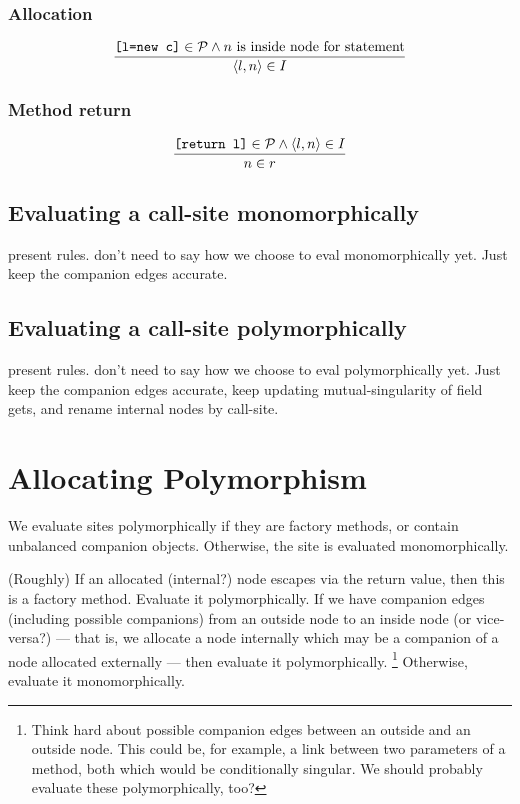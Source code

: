 \documentclass[11pt,notitlepage]{article}
\begin{document}
\subsubsection{Allocation}

\begin{displaymath}
\dfrac
{\text{\tt [l=new c]}\in\mathcal{P} \wedge
 n \text{ is inside node for statement} }
{\left\langle l,n \right\rangle\in I}
\end{displaymath}

\subsubsection{Method return}

\begin{displaymath}
\dfrac
{\text{\tt [return l]}\in\mathcal{P} \wedge
 \left\langle l,n \right\rangle\in I}
{n\in r}
\end{displaymath}


\subsection{Evaluating a call-site monomorphically}

present rules.  don't need to say how we choose to eval
monomorphically yet.  Just keep the companion edges accurate.

\subsection{Evaluating a call-site polymorphically}

present rules.  don't need to say how we choose to eval
polymorphically yet.  Just keep the companion edges accurate,
keep updating mutual-singularity of field gets,
and rename internal nodes by call-site.

\section{Allocating Polymorphism}

We evaluate sites polymorphically if they are factory methods, or
contain unbalanced companion objects.  Otherwise, the site is
evaluated monomorphically.

(Roughly) If an allocated (internal?) node escapes via the return
value, then this is a factory method.  Evaluate it polymorphically.
If we have companion edges (including possible companions) from
an outside node to an inside node (or vice-versa?) --- that is, we
allocate a node internally which may be a companion of a node allocated
externally --- then evaluate it polymorphically.%
\footnote{Think hard about possible companion edges between an
outside and an outside node.  This could be, for example, a
link between two parameters of a method, both which would be
conditionally singular.  We should probably evaluate these
polymorphically, too?}
Otherwise, evaluate it monomorphically.
\end{document}

